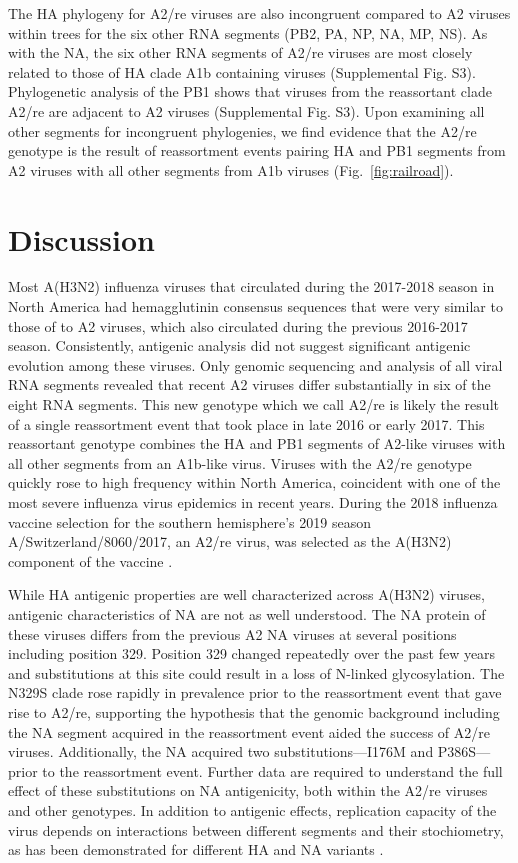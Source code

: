 The HA phylogeny for A2/re viruses are also incongruent compared to A2 viruses within trees for the six other RNA segments (PB2, PA, NP, NA, MP, NS).
As with the NA, the six other RNA segments of A2/re viruses are most closely related to those of HA clade A1b containing viruses (Supplemental Fig. S3).
Phylogenetic analysis of the PB1 shows that viruses from the reassortant clade A2/re are adjacent to A2 viruses (Supplemental Fig. S3).
Upon examining all other segments for incongruent phylogenies, we find evidence that the A2/re genotype is the result of reassortment events pairing HA and PB1 segments from A2 viruses with all other segments from A1b viruses (Fig.~\ref{fig:railroad}).

\section*{Discussion}
Most A(H3N2) influenza viruses that circulated during the 2017-2018 season in North America had hemagglutinin consensus sequences that were very similar to those of to A2 viruses, which also circulated during the previous 2016-2017 season.
Consistently, antigenic analysis did not suggest significant antigenic evolution among these viruses.
Only genomic sequencing and analysis of all viral RNA segments revealed that recent A2 viruses differ substantially in six of the eight RNA segments.
This new genotype which we call A2/re is likely the result of a single reassortment event that took place in late 2016 or early 2017.
This reassortant genotype combines the HA and PB1 segments of A2-like viruses with all other segments from an A1b-like virus.
Viruses with the A2/re genotype quickly rose to high frequency within North America, coincident with one of the most severe influenza virus epidemics in recent years.
During the 2018 influenza vaccine selection for the southern hemisphere’s 2019 season A/Switzerland/8060/2017, an A2/re virus, was selected as the A(H3N2) component of the vaccine \citep{barr_epidemiological_2010}.

While HA antigenic properties are well characterized across A(H3N2) viruses, antigenic characteristics of NA are not as well understood.
The NA protein of these viruses differs from the previous A2 NA viruses at several positions including position 329.
Position 329 changed repeatedly over the past few years and substitutions at this site could result in a loss of N-linked glycosylation.
The N329S clade rose rapidly in prevalence prior to the reassortment event that gave rise to A2/re, supporting the hypothesis that the genomic background including the NA segment acquired in the reassortment event aided the success of A2/re viruses.
Additionally, the NA acquired two substitutions---I176M and P386S---prior to the reassortment event.
Further data are required to understand the full effect of these substitutions on NA antigenicity, both within the A2/re viruses and other genotypes.
In addition to antigenic effects, replication capacity of the virus depends on interactions between different segments and their stochiometry, as has been demonstrated for different HA and NA variants \citep{Yen14264}.

